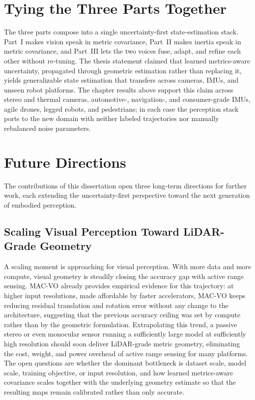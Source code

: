 \section{Tying the Three Parts Together}

The three parts compose into a single uncertainty-first state-estimation stack.
Part~I makes vision speak in metric covariance, Part~II makes inertia speak in metric covariance, and Part~III lets the two voices fuse, adapt, and refine each other without re-tuning.
The thesis statement claimed that learned metrics-aware uncertainty, propagated through geometric estimation rather than replacing it, yields generalizable state estimation that transfers across cameras, IMUs, and unseen robot platforms.
The chapter results above support this claim across stereo and thermal cameras, automotive-, navigation-, and consumer-grade IMUs, agile drones, legged robots, and pedestrians; in each case the perception stack ports to the new domain with neither labeled trajectories nor manually rebalanced noise parameters.

\section{Future Directions}

The contributions of this dissertation open three long-term directions for further work, each extending the uncertainty-first perspective toward the next generation of embodied perception.

\subsection{Scaling Visual Perception Toward LiDAR-Grade Geometry}

A scaling moment is approaching for visual perception.
With more data and more compute, visual geometry is steadily closing the accuracy gap with active range sensing.
MAC-VO already provides empirical evidence for this trajectory: at higher input resolutions, made affordable by faster accelerators, MAC-VO keeps reducing residual translation and rotation error without any change to the architecture, suggesting that the previous accuracy ceiling was set by compute rather than by the geometric formulation.
Extrapolating this trend, a passive stereo or even monocular sensor running a sufficiently large model at sufficiently high resolution should soon deliver LiDAR-grade metric geometry, eliminating the cost, weight, and power overhead of active range sensing for many platforms.
The open questions are whether the dominant bottleneck is dataset scale, model scale, training objective, or input resolution, and how learned metrics-aware covariance scales together with the underlying geometry estimate so that the resulting maps remain calibrated rather than only accurate.

